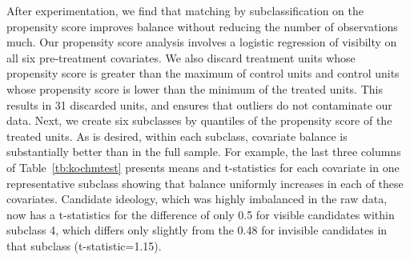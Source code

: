 \documentclass[11pt,titlepage]{article}
\begin{document}
After experimentation, we find that matching by subclassification on
the propensity score improves balance without reducing the number of
observations much.  Our propensity score analysis involves a logistic
regression of visibilty on all six pre-treatment covariates.  We also
discard treatment units whose propensity score is greater than the
maximum of control units and control units whose propensity score is
lower than the minimum of the treated units.  This results in 31
discarded units, and ensures that outliers do not contaminate our
data.  Next, we create six subclasses by quantiles of the propensity
score of the treated units.  As is desired, within each subclass,
covariate balance is substantially better than in the full sample.
For example, the last three columns of Table~\ref{tb:kochmtest}
presents means and t-statistics for each covariate in one
representative subclass showing that balance uniformly increases in
each of these covariates.  Candidate ideology, which was highly
imbalanced in the raw data, now has a t-statistics for the difference
of only 0.5 for visible candidates within subclass 4, which differs
only slightly from the 0.48 for invisible candidates in that subclass
(t-statistic=1.15).
\end{document}
